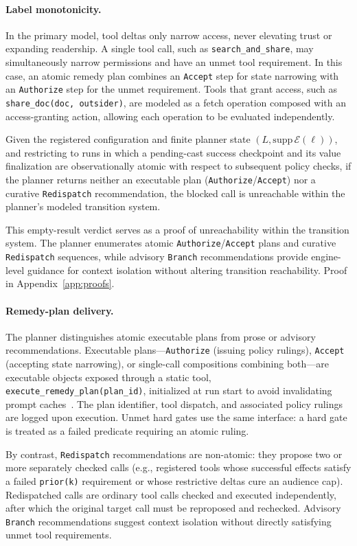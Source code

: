 \paragraph{Label monotonicity.}
In the primary model, tool deltas only narrow access, never elevating trust or expanding readership. A single tool call, such as \texttt{search\_and\_share}, may simultaneously narrow permissions and have an unmet tool requirement. In this case, an atomic remedy plan combines an \texttt{Accept} step for state narrowing with an \texttt{Authorize} step for the unmet requirement. Tools that grant access, such as \texttt{share\_doc(doc, outsider)}, are modeled as a fetch operation composed with an access-granting action, allowing each operation to be evaluated independently.

\begin{theorem}\label{thm:remedy}
Given the registered configuration and finite planner state $(L, \mathrm{supp}\,\mathcal{E}(\ell))$, and restricting to runs in which a pending-cast success checkpoint and its value finalization are observationally atomic with respect to subsequent policy checks, if the planner returns neither an executable plan (\texttt{Authorize}/\allowbreak\texttt{Accept}) nor a curative \texttt{Redispatch} recommendation, the blocked call is unreachable within the planner's modeled transition system.
\end{theorem}
This empty-result verdict serves as a proof of unreachability within the transition system. The planner enumerates atomic \texttt{Authorize}/\allowbreak\texttt{Accept} plans and curative \texttt{Redispatch} sequences, while advisory \texttt{Branch} recommendations provide engine-level guidance for context isolation without altering transition reachability. Proof in Appendix~\ref{app:proofs}.

\paragraph{Remedy-plan delivery.}
The planner distinguishes atomic executable plans from prose or advisory recommendations. Executable plans---\texttt{Authorize} (issuing policy rulings), \texttt{Accept} (accepting state narrowing), or single-call compositions combining both---are executable objects exposed through a static tool, \nolinkurl{execute_remedy_plan(plan_id)}, initialized at run start to avoid invalidating prompt caches~\cite{kwon2023efficient}. The plan identifier, tool dispatch, and associated policy rulings are logged upon execution. Unmet hard gates use the same interface: a hard gate is treated as a failed predicate requiring an atomic ruling.

By contrast, \texttt{Redispatch} recommendations are non-atomic: they propose two or more separately checked calls (e.g., registered tools whose successful effects satisfy a failed \texttt{prior(k)} requirement or whose restrictive deltas cure an audience cap). Redispatched calls are ordinary tool calls checked and executed independently, after which the original target call must be reproposed and rechecked. Advisory \texttt{Branch} recommendations suggest context isolation without directly satisfying unmet tool requirements.
